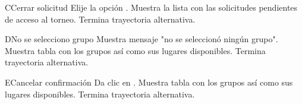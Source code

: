 	\begin{UCtrayectoriaA}{C}{Cerrar solicitud}
		\UCpaso[\UCactor] Elije la opción .
		\UCpaso Muestra la lista con las solicitudes pendientes de acceso al torneo.
		\UCpaso Termina trayectoria alternativa.
	\end{UCtrayectoriaA}
	
	\begin{UCtrayectoriaA}{D}{No se selecciono grupo}
		\UCpaso Muestra mensaje "no se seleccionó ningún grupo".
		\UCpaso Muestra tabla con los grupos así como sus lugares disponibles.
		\UCpaso Termina trayectoria alternativa.
	\end{UCtrayectoriaA}
	
	\begin{UCtrayectoriaA}{E}{Cancelar confirmación}
		\UCpaso[\UCactor] Da clic en .
		\UCpaso Muestra tabla con los grupos así como sus lugares disponibles.
		\UCpaso Termina trayectoria alternativa.
	\end{UCtrayectoriaA}
